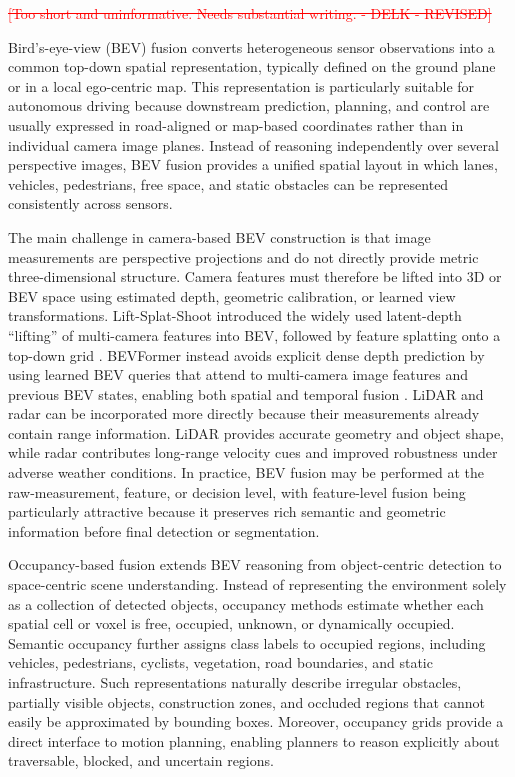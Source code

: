 \documentclass[11pt,oneside,openany]{book}
\newcommand{\deleted}[1]{\textcolor{red}{\sout{#1}}}
\begin{document}
\deleted{[Too short and uninformative. Needs substantial writing. - DELK - REVISED]}

Bird's-eye-view (BEV) fusion converts heterogeneous sensor observations into a common top-down spatial representation, typically defined on the ground plane or in a local ego-centric map. This representation is particularly suitable for autonomous driving because downstream prediction, planning, and control are usually expressed in road-aligned or map-based coordinates rather than in individual camera image planes. Instead of reasoning independently over several perspective images, BEV fusion provides a unified spatial layout in which lanes, vehicles, pedestrians, free space, and static obstacles can be represented consistently across sensors.

The main challenge in camera-based BEV construction is that image measurements are perspective projections and do not directly provide metric three-dimensional structure. Camera features must therefore be lifted into 3D or BEV space using estimated depth, geometric calibration, or learned view transformations. Lift-Splat-Shoot introduced the widely used latent-depth ``lifting'' of multi-camera features into BEV, followed by feature splatting onto a top-down grid \cite{philion2020_lss}. BEVFormer instead avoids explicit dense depth prediction by using learned BEV queries that attend to multi-camera image features and previous BEV states, enabling both spatial and temporal fusion \cite{li2022_bevformer}. LiDAR and radar can be incorporated more directly because their measurements already contain range information. LiDAR provides accurate geometry and object shape, while radar contributes long-range velocity cues and improved robustness under adverse weather conditions. In practice, BEV fusion may be performed at the raw-measurement, feature, or decision level, with feature-level fusion being particularly attractive because it preserves rich semantic and geometric information before final detection or segmentation.

Occupancy-based fusion extends BEV reasoning from object-centric detection to space-centric scene understanding. Instead of representing the environment solely as a collection of detected objects, occupancy methods estimate whether each spatial cell or voxel is free, occupied, unknown, or dynamically occupied. Semantic occupancy further assigns class labels to occupied regions, including vehicles, pedestrians, cyclists, vegetation, road boundaries, and static infrastructure. Such representations naturally describe irregular obstacles, partially visible objects, construction zones, and occluded regions that cannot easily be approximated by bounding boxes. Moreover, occupancy grids provide a direct interface to motion planning, enabling planners to reason explicitly about traversable, blocked, and uncertain regions.
\end{document}

